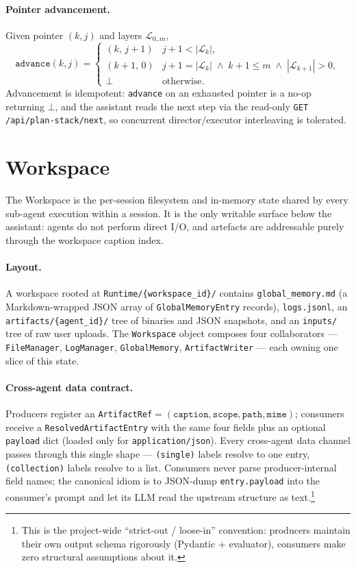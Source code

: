 \paragraph{Pointer advancement.}
Given pointer $(k,j)$ and layers $\mathcal{L}_{0..m}$,
\begin{equation*}
\texttt{advance}(k,j) =
\begin{cases}
(k,\,j{+}1) & j{+}1 < |\mathcal{L}_k|, \\
(k{+}1,\,0) & j{+}1 = |\mathcal{L}_k|\;\wedge\;k{+}1\!\le\!m\;\wedge\;|\mathcal{L}_{k{+}1}|>0, \\
\bot & \text{otherwise.}
\end{cases}
\end{equation*}
Advancement is idempotent: \texttt{advance} on an exhausted pointer is
a no-op returning $\bot$, and the assistant reads the next step via the
read-only \texttt{GET /api/plan-stack/next}, so concurrent
director/executor interleaving is tolerated.


\section{Workspace}
\label{sec:workspace}

The Workspace is the per-session filesystem and in-memory state shared
by every sub-agent execution within a session. It is the only writable
surface below the assistant: agents do not perform direct I/O, and
artefacts are addressable purely through the workspace caption index.

\paragraph{Layout.}
A workspace rooted at \texttt{Runtime/\{workspace\_id\}/} contains
\texttt{global\_memory.md} (a Markdown-wrapped JSON array of
\texttt{GlobalMemoryEntry} records), \texttt{logs.jsonl}, an
\texttt{artifacts/\{agent\_id\}/} tree of binaries and JSON snapshots,
and an \texttt{inputs/} tree of raw user uploads. The
\texttt{Workspace} object composes four collaborators —
\texttt{FileManager}, \texttt{LogManager}, \texttt{GlobalMemory},
\texttt{ArtifactWriter} — each owning one slice of this state.

\paragraph{Cross-agent data contract.}
Producers register an \texttt{ArtifactRef}$=(\texttt{caption},\texttt{scope},\texttt{path},\texttt{mime})$;
consumers receive a \texttt{ResolvedArtifactEntry} with the same four
fields plus an optional \texttt{payload} dict (loaded only for
\texttt{application/json}). Every cross-agent data channel passes
through this single shape — \texttt{(single)} labels resolve to one
entry, \texttt{(collection)} labels resolve to a list. Consumers never
parse producer-internal field names; the canonical idiom is to JSON-dump
\texttt{entry.payload} into the consumer's prompt and let its LLM read
the upstream structure as text.\footnote{This is the project-wide
``strict-out / loose-in'' convention: producers maintain their own
output schema rigorously (Pydantic + evaluator), consumers make zero
structural assumptions about it.}

